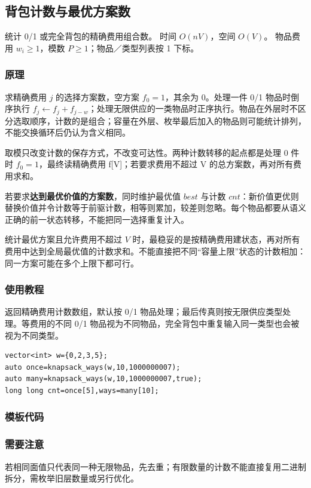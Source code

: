 \subsection{背包计数与最优方案数}
\label{dp:knapsack-count}
\AlgorithmInfo
    {统计 0/1 或完全背包的精确费用组合数。}
    {时间 $O(nV)$，空间 $O(V)$。}
    {物品费用 $w_i\ge1$，模数 $P\ge1$；物品／类型列表按 1 下标。}
\subsubsection*{原理}

求精确费用 $j$ 的选择方案数，空方案 $f_0=1$，其余为 0。处理一件 0/1 物品时倒序执行 $f_j\gets f_j+f_{j-w}$；处理无限供应的一类物品时正序执行。物品在外层时不区分选取顺序，计数的是组合；容量在外层、枚举最后加入的物品则可能统计排列，不能交换循环后仍认为含义相同。

取模只改变计数的保存方式，不改变可达性。两种计数转移的起点都是处理 0 件时 $f_0=1$，最终读精确费用 f[V]；若要求费用不超过 V 的总方案数，再对所有费用求和。

若要求\textbf{达到最优价值的方案数}，同时维护最优值 $best$ 与计数 $cnt$：新价值更优则替换价值并令计数等于前驱计数，相等则累加，较差则忽略。每个物品都要从语义正确的前一状态转移，不能把同一选择重复计入。

统计最优方案且允许费用不超过 $V$ 时，最稳妥的是按精确费用建状态，再对所有费用中达到全局最优值的计数求和。不能直接把不同“容量上限”状态的计数相加：同一方案可能在多个上限下都可行。

\subsubsection*{使用教程}
 返回精确费用计数数组，默认按 0/1 物品处理；最后传真则按无限供应类型处理。等费用的不同 0/1 物品视为不同物品，完全背包中重复输入同一类型也会被视为不同类型。
\begin{lstlisting}[style=mtycpp,numbers=none]
vector<int> w={0,2,3,5};
auto once=knapsack_ways(w,10,1000000007);
auto many=knapsack_ways(w,10,1000000007,true);
long long cnt=once[5],ways=many[10];
\end{lstlisting}
\subsubsection*{模板代码}
\subsubsection*{需要注意}
若相同面值只代表同一种无限物品，先去重；有限数量的计数不能直接复用二进制拆分，需枚举旧层数量或另行优化。
